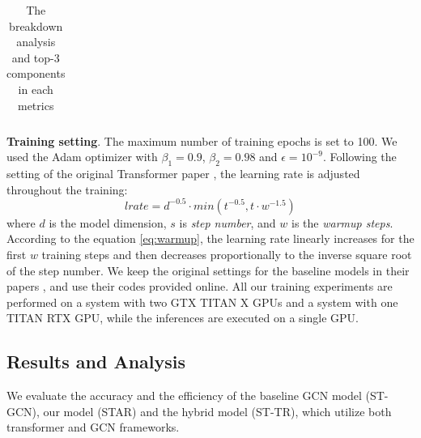 \documentclass[letterpaper]{article} %
\begin{document}
\begin{table}[!h]
\begin{tabular}{cccc}
\end{tabular}
\caption{The breakdown analysis and top-3 components in each metrics}
\label{tab:3_metrics}
\end{table}

\textbf{Training setting}. The maximum number of training epochs is set to 100. We used the Adam optimizer \cite{kingma2014adam} with $\beta_1 = 0.9$, $\beta_2 = 0.98$ and $\epsilon = 10^{-9}$. Following the setting of the original Transformer paper \cite{attn2017all}, the learning rate is adjusted throughout the training:
\begin{equation}
    lrate = d^{-0.5} \cdot min(t^{-0.5}, t \cdot w^{-1.5})
    \label{eq:warmup}
\end{equation}
where $d$ is the model dimension, $s$ is \textit{step number}, and $w$ is the \textit{warmup steps}. According to the equation \ref{eq:warmup}, the learning rate linearly increases for the first $w$ training steps and then decreases proportionally to the inverse square root of the step number. We keep the original settings for the baseline models in their papers \cite{yan2018spatial, plizzari2020spatial}, and use their codes provided online. 
All our training experiments are performed on a system with two GTX TITAN X GPUs and a system with one TITAN RTX GPU, while the inferences are executed on a single GPU. %

\subsection{Results and Analysis}
We evaluate the accuracy and the efficiency of the baseline GCN model (ST-GCN), our model (STAR) and the hybrid model (ST-TR), which utilize both transformer and GCN frameworks.
\end{document}
